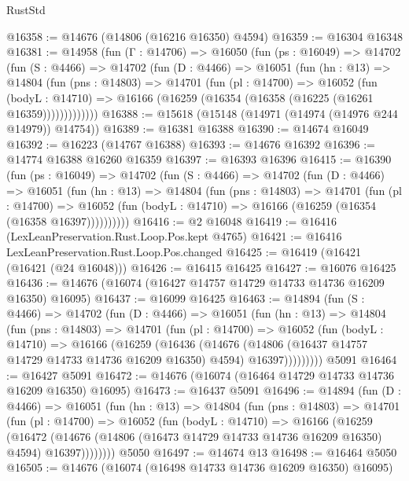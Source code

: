 \begin{lexlean}{RustStd}
\begin{coremodule}
@16358 := @14676 (@14806 (@16216 @16350) @4594)
@16359 := @16304 @16348
@16381 := @14958
    (fun (Γ : @14706) =>
    @16050
      (fun (ps : @16049) =>
      @14702
        (fun (S : @4466) =>
        @14702
          (fun (D : @4466) =>
          @16051
            (fun (hn : @13) =>
            @14804
              (fun (pns : @14803) =>
              @14701
                (fun (pl : @14700) =>
                @16052
                  (fun (bodyL : @14710) =>
                  @16166 (@16259 (@16354 (@16358 (@16225 (@16261 @16359)))))))))))))
@16388 := @15618 (@15148 (@14971 (@14974 (@14976 @244 @14979)) @14754))
@16389 := @16381 @16388
@16390 := @14674 @16049
@16392 := @16223 (@14767 @16388)
@16393 := @14676 @16392
@16396 := @14774 @16388 @16260 @16359
@16397 := @16393 @16396
@16415 := @16390
    (fun (ps : @16049) =>
    @14702
      (fun (S : @4466) =>
      @14702
        (fun (D : @4466) =>
        @16051
          (fun (hn : @13) =>
          @14804
            (fun (pns : @14803) =>
            @14701
              (fun (pl : @14700) =>
              @16052 (fun (bodyL : @14710) => @16166 (@16259 (@16354 (@16358 @16397))))))))))
@16416 := @2 @16048
@16419 := @16416 (LexLeanPreservation.Rust.Loop.Pos.kept @4765)
@16421 := @16416 LexLeanPreservation.Rust.Loop.Pos.changed
@16425 := @16419 (@16421 (@16421 (@24 @16048)))
@16426 := @16415 @16425
@16427 := @16076 @16425
@16436 := @14676 (@16074 (@16427 @14757 @14729 @14733 @14736 @16209 @16350) @16095)
@16437 := @16099 @16425
@16463 := @14894
    (fun (S : @4466) =>
    @14702
      (fun (D : @4466) =>
      @16051
        (fun (hn : @13) =>
        @14804
          (fun (pns : @14803) =>
          @14701
            (fun (pl : @14700) =>
            @16052
              (fun (bodyL : @14710) =>
              @16166
                (@16259
                  (@16436
                    (@14676
                      (@14806 (@16437 @14757 @14729 @14733 @14736 @16209 @16350) @4594)
                      @16397)))))))))
    @5091
@16464 := @16427 @5091
@16472 := @14676 (@16074 (@16464 @14729 @14733 @14736 @16209 @16350) @16095)
@16473 := @16437 @5091
@16496 := @14894
    (fun (D : @4466) =>
    @16051
      (fun (hn : @13) =>
      @14804
        (fun (pns : @14803) =>
        @14701
          (fun (pl : @14700) =>
          @16052
            (fun (bodyL : @14710) =>
            @16166
              (@16259
                (@16472
                  (@14676 (@14806 (@16473 @14729 @14733 @14736 @16209 @16350) @4594) @16397))))))))
    @5050
@16497 := @14674 @13
@16498 := @16464 @5050
@16505 := @14676 (@16074 (@16498 @14733 @14736 @16209 @16350) @16095)

\end{coremodule}
\end{lexlean}
